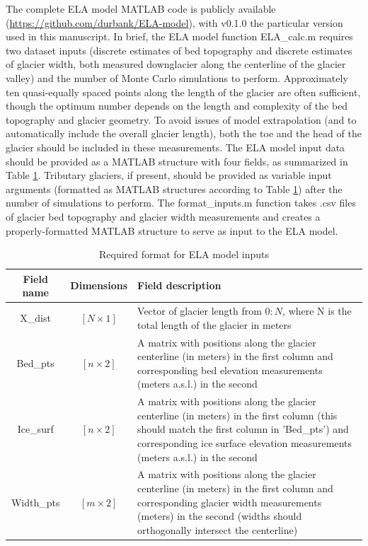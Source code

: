 \documentclass[review]{elsarticle}
\begin{document}
The complete ELA model MATLAB code is publicly available (\url{https://github.com/durbank/ELA-model}), with v0.1.0 the particular version used in this manuscript.
In brief, the ELA model function ELA\_calc.m requires two dataset inputs (discrete estimates of bed topography and discrete estimates of glacier width, both measured downglacier along the centerline of the glacier valley) and the number of Monte Carlo simulations to perform.
Approximately ten quasi-equally spaced points along the length of the glacier are often sufficient, though the optimum number depends on the length and complexity of the bed topography and glacier geometry.
To avoid issues of model extrapolation (and to automatically include the overall glacier length), both the toe and the head of the glacier should be included in these measurements.
The ELA model input data should be provided as a MATLAB structure with four fields, as summarized in Table \ref{tab:inputs}.
Tributary glaciers, if present, should be provided as variable input arguments (formatted as MATLAB structures according to Table \ref{tab:inputs}) after the number of simulations to perform.
The format\_inputs.m function takes .csv files of glacier bed topography and glacier width measurements and creates a properly-formatted MATLAB structure to serve as input to the ELA model.

\begin{table}[]
    \centering
    \begin{tabular}{c|c|p{11cm}}
        Field name  & Dimensions & Field description \\
        \hline
        X\_dist & $[N \times 1]$ & Vector of glacier length from $0:N$, where N is the total length of the glacier in meters \\
        Bed\_pts & $[n \times 2]$ & A matrix with positions along the glacier centerline (in meters) in the first column and corresponding bed elevation measurements (meters a.s.l.) in the second \\
        Ice\_surf & $[n \times 2]$ & A matrix with positions along the glacier centerline (in meters) in the first column (this should match the first column in 'Bed\_pts') and corresponding ice surface  elevation measurements (meters a.s.l.) in the second \\
        Width\_pts & $[m \times 2]$ & A matrix with positions along the glacier centerline (in meters) in the first column and corresponding glacier width measurements (meters) in the second (widths should orthogonally intersect the centerline)
    \end{tabular}
    \caption{Required format for ELA model inputs}
    \label{tab:inputs}
\end{table}
\end{document}
